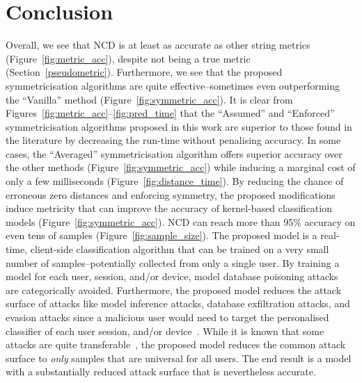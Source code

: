 \documentclass[preprint,12pt]{article}
\begin{document}
\section{Conclusion}
\label{conclusion}

Overall, we see that NCD is at least as accurate as other string metrics (Figure~\ref{fig:metric_acc}), despite not being a true metric (Section~\ref{pseudometric}). 
Furthermore, we see that the proposed symmetricisation algorithms are quite effective--sometimes even outperforming the ``Vanilla'' method (Figure~\ref{fig:symmetric_acc}). 
It is clear from Figures~\ref{fig:metric_acc}--\ref{fig:pred_time} that the ``Assumed'' and ``Enforced'' symmetricisation algorithms proposed in this work are superior to those found in the literature by decreasing the run-time without penalising accuracy.
In some cases, the ``Averaged'' symmetricisation algorithm offers superior accuracy over the other methods (Figure~\ref{fig:symmetric_acc}) while inducing a marginal cost of only a few milliseconds (Figure~\ref{fig:distance_time}).
By reducing the chance of erroneous zero distances and enforcing symmetry, the proposed modifications induce metricity that can improve the accuracy of kernel-based classification models (Figure~\ref{fig:symmetric_acc}).
NCD can reach more than 95\% accuracy on even tens of samples (Figure~\ref{fig:sample_size}).
The proposed model is a real-time, client-side classification algorithm that can be trained on a very small number of samples--potentially collected from only a single user.
By training a model for each user, session, and/or device, model database poisoning attacks~\cite{biggio_poisoning_2013} are categorically avoided.
Furthermore, the proposed model reduces the attack surface of attacks like model inference attacks, database exfiltration attacks, and evasion attacks since a malicious user would need to target the personalised classifier of each user session, and/or device~\cite{biggio_evasion_2013,deepfool,chakraborty_adversarial_2018,extraction_attack}.
While it is known that some attacks are quite transferable~\cite{wang2021enhancing}, the proposed model reduces the common attack surface to \textit{only} samples that are universal for all users. 
The end result is a model with a substantially reduced attack surface that is nevertheless accurate.



 

\end{document}
